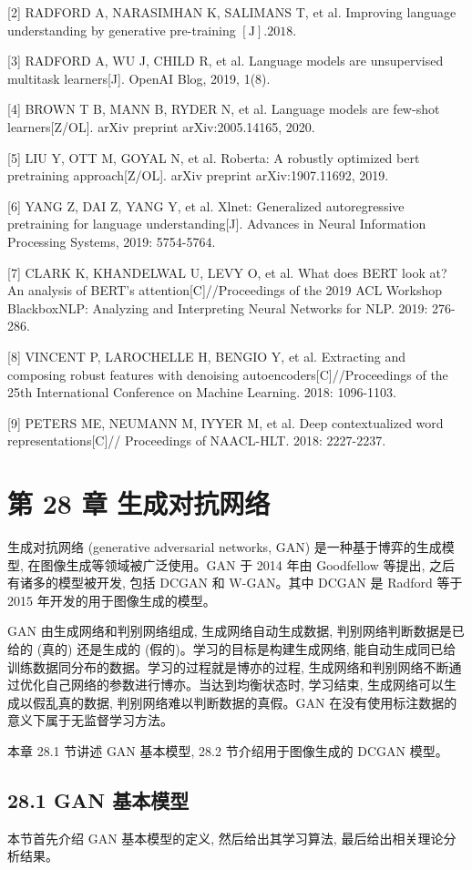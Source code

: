 \documentclass[10pt]{article}
\begin{document}
[2] RADFORD A, NARASIMHAN K, SALIMANS T, et al. Improving language understanding by generative pre-training $[\mathrm{J}] .2018$.

[3] RADFORD A, WU J, CHILD R, et al. Language models are unsupervised multitask learners[J]. OpenAI Blog, 2019, 1(8).

[4] BROWN T B, MANN B, RYDER N, et al. Language models are few-shot learners[Z/OL]. arXiv preprint arXiv:2005.14165, 2020.

[5] LIU Y, OTT M, GOYAL N, et al. Roberta: A robustly optimized bert pretraining approach[Z/OL]. arXiv preprint arXiv:1907.11692, 2019.

[6] YANG Z, DAI Z, YANG Y, et al. Xlnet: Generalized autoregressive pretraining for language understanding[J]. Advances in Neural Information Processing Systems, 2019: 5754-5764.

[7] CLARK K, KHANDELWAL U, LEVY O, et al. What does BERT look at? An analysis of BERT's attention[C]//Proceedings of the 2019 ACL Workshop BlackboxNLP: Analyzing and Interpreting Neural Networks for NLP. 2019: 276-286.

[8] VINCENT P, LAROCHELLE H, BENGIO Y, et al. Extracting and composing robust features with denoising autoencoders[C]//Proceedings of the 25th International Conference on Machine Learning. 2018: 1096-1103.

[9] PETERS ME, NEUMANN M, IYYER M, et al. Deep contextualized word representations[C]// Proceedings of NAACL-HLT. 2018: 2227-2237.

\section*{第 28 章 生成对抗网络}
生成对抗网络 (generative adversarial networks, GAN) 是一种基于博弈的生成模型, 在图像生成等领域被广泛使用。GAN 于 2014 年由 Goodfellow 等提出, 之后有诸多的模型被开发, 包括 DCGAN 和 W-GAN。其中 DCGAN 是 Radford 等于 2015 年开发的用于图像生成的模型。

GAN 由生成网络和判别网络组成, 生成网络自动生成数据, 判别网络判断数据是已给的 (真的) 还是生成的 (假的)。学习的目标是构建生成网络, 能自动生成同已给训练数据同分布的数据。学习的过程就是博亦的过程, 生成网络和判别网络不断通过优化自己网络的参数进行博亦。当达到均衡状态时, 学习结束, 生成网络可以生成以假乱真的数据, 判别网络难以判断数据的真假。GAN 在没有使用标注数据的意义下属于无监督学习方法。

本章 28.1 节讲述 GAN 基本模型, 28.2 节介绍用于图像生成的 DCGAN 模型。

\subsection*{28.1 GAN 基本模型}
本节首先介绍 GAN 基本模型的定义, 然后给出其学习算法, 最后给出相关理论分析结果。
\end{document}
